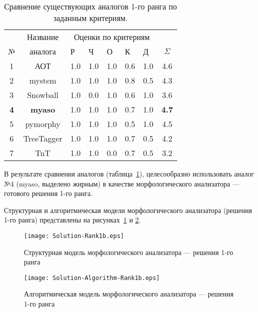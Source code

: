 \begin{table}[H]
\caption{\label{tab:Analogs:Rank1}Сравнение существующих аналогов
1-го ранга по заданным критериям.}
\begin{tabular}{|c||c||*{5}{p{1cm}|}|c|}
\hline
  & Название   & \multicolumn{5}{c||}{Оценки по критериям} & \\
                \cline{3-7}
№ & аналога    &  Р  &  Ч  &  О  &  К  &  Д  & \huge $\Sigma$ \\
\hline
\hline
1 & АОТ        & 1.0 & 1.0 & 1.0 & 0.6 & 1.0 & 4.6 \\
\hline
2 & mystem     & 1.0 & 1.0 & 1.0 & 0.8 & 0.5 & 4.3 \\
\hline
3 & Snowball   & 1.0 & 0.0 & 1.0 & 0.6 & 1.0 & 3.6 \\
\hline
\textbf{4}
  & \textbf{myaso}
               & 1.0 & 1.0 & 1.0 & 0.7 & 1.0 & \textbf{4.7} \\
\hline
5 & pymorphy   & 1.0 & 1.0 & 1.0 & 0.5 & 1.0 & 4.5 \\
\hline
6 & TreeTagger & 1.0 & 1.0 & 1.0 & 0.7 & 0.5 & 4.2 \\
\hline
7 & TnT        & 1.0 & 1.0 & 0.0 & 0.7 & 0.5 & 3.2 \\
\hline
\end{tabular}
\end{table}

В результате сравнения аналогов (таблица~\ref{tab:Analogs:Rank1}),
целесообразно использовать аналог №4 (myaso, выделено жирным) в
качестве морфологического анализатора — готового решения
1-го ранга.

Структурная и алгоритмическая модели морфологического
анализатора (решения 1-го ранга) представлены на
рисунках~\ref{fig:Solution-Rank1b} и
\ref{fig:Solution-Algorithm-Rank1b}.

\begin{figure}[H]
  \centering
  \texttt{[image: Solution-Rank1b.eps]}
  \caption{Структурная модель морфологического анализатора —
решения 1-го ранга}
  \label{fig:Solution-Rank1b}
\end{figure}

\begin{figure}[H]
  \centering
  \texttt{[image: Solution-Algorithm-Rank1b.eps]}
  \caption{Алгоритмическая модель морфологического анализатора —
решения 1-го ранга}
  \label{fig:Solution-Algorithm-Rank1b}
\end{figure}

